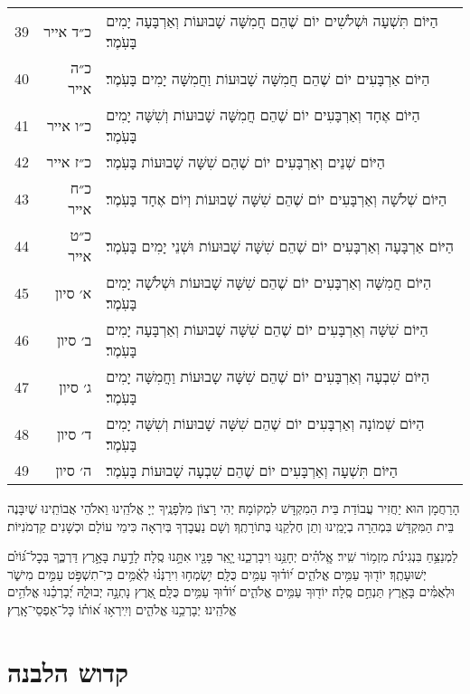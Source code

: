 \documentclass[twoside, openany, parskip=half, 11pt]{book}
\begin{document}
\begin{scriptsize}
\begin{longtable}{ l | r | p{} }
39 & כ״ד אייר & הַיּוֹם תִּשְׁעָה וּשְׁלֹשִׁים יוֹם שֶׁהֵם חֲמִשָּׁה שָׁבוּעוֹת וְאַרְבָּעָה יָמִים בָּעֹֽמֶר׃ \\
40 & כ״ה אייר & הַיּוֹם אַרְבָּעִים יוֹם שֶׁהֵם חֲמִשָּׁה שָׁבוּעוֹת וַחֲמִשָּׁה יָמִים בָּעֹֽמֶר׃ \\
41 & כ״ו אייר & הַיּוֹם אֶחָד וְאַרְבָּעִים יוֹם שֶׁהֵם חֲמִשָּׁה שָׁבוּעוֹת וְשִׁשָּׁה יָמִים בָּעֹֽמֶר׃ \\
42 & כ״ז אייר & הַיּוֹם שְׁנֵים וְאַרְבָּעִים יוֹם שֶׁהֵם שִׁשָּׁה שָׁבוּעוֹת בָּעֹֽמֶר׃ \\
43 & כ״ח אייר & הַיּוֹם שְׁלֹשָׁה וְאַרְבָּעִים יוֹם שֶׁהֵם שִׁשָּׁה שָׁבוּעוֹת וְיוֹם אֶחָד בָּעֹֽמֶר׃ \\
44 & כ״ט אייר & הַיּוֹם אַרְבָּעָה וְאַרְבָּעִים יוֹם שֶׁהֵם שִׁשָּׁה שָׁבוּעוֹת וּשְׁנֵי יָמִים בָּעֹֽמֶר׃ \\
45 & א׳ סיון & הַיּוֹם חֲמִשָּׁה וְאַרְבָּעִים יוֹם שֶׁהֵם שִׁשָּׁה שָׁבוּעוֹת וּשְׁלֹשָׁה יָמִים בָּעֹֽמֶר׃ \\
46 & ב׳ סיון & הַיּוֹם שִׁשָּׁה וְאַרְבָּעִים יוֹם שֶׁהֵם שִׁשָּׁה שָׁבוּעוֹת וְאַרְבָּעָה יָמִים בָּעֹֽמֶר׃ \\
47 & ג׳ סיון & הַיּוֹם שִׁבְעָה וְאַרְבָּעִים יוֹם שֶׁהֵם שִׁשָּׁה שָבוּעוֹת וַחֲמִשָּׁה יָמִים בָּעֹֽמֶר׃ \\
48 & ד׳ סיון & הַיּוֹם שְׁמוֹנָה וְאַרְבָּעִים יוֹם שֶׁהֵם שִׁשָּׁה שָׁבוּעוֹת וְשִׁשָּׁה יָמִים בָּעֹֽמֶר׃ \\
49 & ה׳ סיון & הַיּוֹם תִּשְׁעָה וְאַרְבָּעִים יוֹם שֶׁהֵם שִׁבְעָה שָׁבוּעוֹת בָּעֹֽמֶר׃
\end{longtable}
\end{scriptsize}



הָרַחֲמָן הוּא יַחֲזִיר עֲבוֹדַת בֵּית הַמִקְדָּשׁ לִמְקוֹמָהּ׃
יְהִי רָצוֹן מִלְּפָנֶֽיךָ יְיָ אֱלֹהֵֽינוּ וֵאלֹהֵי אֲבוֹתֵֽינוּ שֶׁיִבָּנֶה בֵּית הַמִּקְדָּשׁ בִּמְהֵרָה בְיָמֵֽינוּ וְתֵן חֶלְקֵֽנוּ בְּתוֹרָתֶֽךָ׃ וְשָׁם נַעֲבׇדְךָ בְּיִרְאָה כִּימֵי עוֹלָם וּכְשָׁנִים קַדְמֹנִיּוֹת׃


לַמְנַצֵּ֥חַ בִּנְגִינֹ֗ת מִזְמ֥וֹר שִֽׁיר׃ אֱֽלֹהִ֗ים יְחָנֵּ֥נוּ וִיבָרְכֵ֑נוּ יָ֤אֵֽר פָּנָ֖יו אִתָּ֣נוּ סֶֽלָה׃ לָדַ֣עַת בָּאָ֣רֶץ דַּרְכֶּ֑ךָ בְּכׇל־גּ֝וֹיִ֗ם יְשׁוּעָתֶֽךָ׃ יוֹד֖וּךָ עַמִּ֥ים אֱלֹהִ֑ים י֝וֹד֗וּךָ עַמִּ֥ים כֻּלָּֽם׃ יִ֥שְׂמְח֥וּ וִירַנְּנ֗וּ לְאֻ֫מִּ֥ים כִּֽי־תִשְׁפֹּ֣ט עַמִּ֣ים מִישֹׁ֑ר וּלְאֻמִּ֓ים בָּאָ֖רֶץ תַּנְחֵ֣ם סֶֽלָה׃ יוֹד֖וּךָ עַמִּ֥ים אֱלֹהִ֑ים י֝וֹד֗וּךָ עַמִּ֥ים כֻּלָּֽם׃ אֶ֭רֶץ נָתְנָ֣ה יְבוּלָ֑הּ יְ֝בָרְכֵ֗נוּ אֱלֹהִ֥ים
אֱלֹהֵֽינוּ׃ יְבָרְכֵ֥נוּ אֱלֹהִ֑ים וְיִֽירְא֥וּ א֝וֹת֗וֹ כָּל־אַפְסֵי־אָֽרֶץ׃

\section[קדוש הלבנה]{ קדוש הלבנה }
\end{document}
